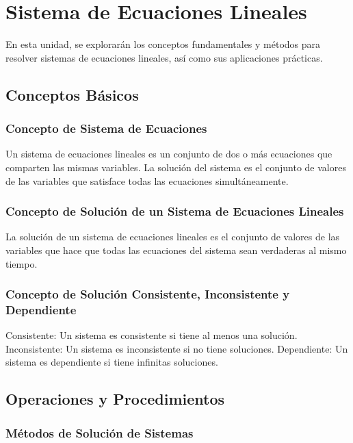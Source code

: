     \section{Sistema de Ecuaciones Lineales} %

    En esta unidad, se explorarán los conceptos fundamentales y métodos para resolver sistemas de ecuaciones lineales, así como sus aplicaciones prácticas.
    
    \subsection{Conceptos Básicos}
    
    \subsubsection{Concepto de Sistema de Ecuaciones}
    
    Un sistema de ecuaciones lineales es un conjunto de dos o más ecuaciones que comparten las mismas variables. La solución del sistema es el conjunto de valores de las variables que satisface todas las ecuaciones simultáneamente.
    
    \subsubsection{Concepto de Solución de un Sistema de Ecuaciones Lineales}
    
    La solución de un sistema de ecuaciones lineales es el conjunto de valores de las variables que hace que todas las ecuaciones del sistema sean verdaderas al mismo tiempo.
    
    \subsubsection{Concepto de Solución Consistente, Inconsistente y Dependiente}
    
    Consistente: Un sistema es consistente si tiene al menos una solución.
    Inconsistente: Un sistema es inconsistente si no tiene soluciones.
    Dependiente: Un sistema es dependiente si tiene infinitas soluciones.
    \subsection{Operaciones y Procedimientos}
    
    \subsubsection{Métodos de Solución de Sistemas}
    
